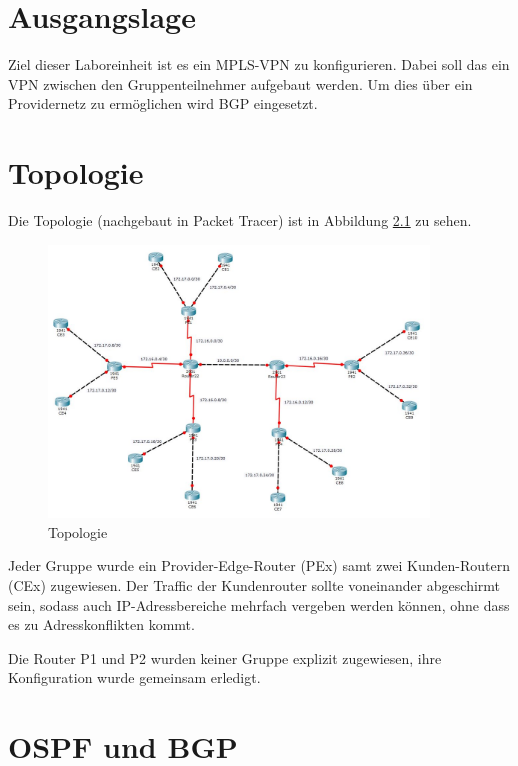 \thispagestyle{standard}
\pagestyle{standard}
\chapter{Ausgangslage}

Ziel dieser Laboreinheit ist es ein \ac{MPLS}-VPN zu konfigurieren. Dabei soll das ein VPN zwischen den Gruppenteilnehmer aufgebaut werden. Um dies über ein Providernetz zu ermöglichen wird \ac{BGP} eingesetzt. 

\chapter{Topologie}

Die Topologie (nachgebaut in Packet Tracer) ist in Abbildung \ref{img:topo} zu sehen.

\begin{figure}[H]
	\centering
	\includegraphics[width=0.9\textwidth]{img/Topologie.JPG}
	\caption{Topologie}
	\label{img:topo}
\end{figure}

Jeder Gruppe wurde ein Provider-Edge-Router (PEx) samt zwei Kunden-Routern (CEx) zugewiesen. Der Traffic der Kundenrouter sollte voneinander abgeschirmt sein, sodass auch IP-Adressbereiche mehrfach vergeben werden können, ohne dass es zu Adresskonflikten kommt.


Die Router P1 und P2 wurden keiner Gruppe explizit zugewiesen, ihre Konfiguration wurde gemeinsam erledigt.

\chapter{OSPF und BGP}

